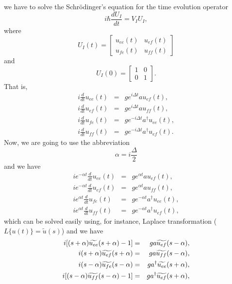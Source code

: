 \documentclass[12pt,thmsa]{article}
\begin{document}
we have to solve the Schr\"{o}dinger's equation for the time evolution
operator%
\begin{equation}
i\hbar \frac{dU_{I}}{dt}=V_{I}U_{I},  \label{AP2}
\end{equation}%
where%
\begin{equation}
U_{I}(t)=\left[ 
\begin{array}{cc}
u_{ee}(t) & u_{ef}(t) \\ 
u_{fe}(t) & u_{ff}(t)%
\end{array}%
\right]
\end{equation}%
and%
\begin{equation}
U_{I}(0)=\left[ 
\begin{array}{cc}
1 & 0 \\ 
0 & 1%
\end{array}%
\right] .
\end{equation}%
That is,%
\begin{eqnarray}
i\frac{d}{dt}u_{ee}(t) &=&ge^{i\Delta t}au_{ef}(t),  \nonumber \\
i\frac{d}{dt}u_{ef}(t) &=&ge^{i\Delta t}au_{ff}(t),  \nonumber \\
i\frac{d}{dt}u_{fe}(t) &=&ge^{-i\Delta t}a^{\dagger }u_{ee}(t),  \nonumber \\
i\frac{d}{dt}u_{ff}(t) &=&ge^{-i\Delta t}a^{\dagger }u_{ef}(t).  \label{EDI4}
\end{eqnarray}%
Now, we are going to use the abbreviation%
\begin{equation}
\alpha =i\frac{\Delta }{2}
\end{equation}%
and we have%
\begin{eqnarray}
ie^{-\alpha t}\frac{d}{dt}u_{ee}(t) &=&ge^{\alpha t}au_{ef}(t),  \nonumber \\
ie^{-\alpha t}\frac{d}{dt}u_{ef}(t) &=&ge^{\alpha t}au_{ff}(t),  \nonumber \\
ie^{\alpha t}\frac{d}{dt}u_{fe}(t) &=&ge^{-\alpha t}a^{\dagger }u_{ee}(t), 
\nonumber \\
ie^{\alpha t}\frac{d}{dt}u_{ff}(t) &=&ge^{-\alpha t}a^{\dagger }u_{ef}(t),
\end{eqnarray}%
which can be solved easily using, for instance, Laplace transformation ($%
L\{u(t)\}=\widetilde{u}(s)$) and we have 
\begin{eqnarray}
i[(s+\alpha )\widetilde{u_{ee}}(s+\alpha )-1] &=&ga\widetilde{u_{ef}}%
(s-\alpha ),  \nonumber \\
i(s+\alpha )\widetilde{u_{ef}}(s+\alpha ) &=&ga\widetilde{u_{ff}}(s-\alpha ),
\nonumber \\
i(s-\alpha )\widetilde{u_{fe}}(s-\alpha ) &=&ga^{\dagger }\widetilde{u_{ee}}%
(s+\alpha ),  \nonumber \\
i[(s-\alpha )\widetilde{u_{ff}}(s-\alpha )-1] &=&ga^{\dagger }\widetilde{%
u_{ef}}(s+\alpha ),
\end{eqnarray}%
\end{document}

